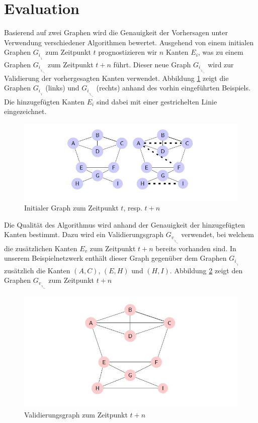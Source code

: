 \section{Evaluation}
Basierend auf zwei Graphen wird die Genauigkeit der Vorhersagen unter Verwendung verschiedener Algorithmen bewertet.
Ausgehend von einem initialen Graphen $G_i_,_t$ zum Zeitpunkt $t$ prognostizieren wir $n$ Kanten $E_i$, was zu einem Graphen $G_i_,_t_+_n$ zum Zeitpunkt $t + n$ führt.
Dieser neue Graph $G_i_,_t_+_n$  wird zur Validierung der vorhergesagten Kanten verwendet.
Abbildung \ref{fig:graph_init} zeigt die Graphen $G_i_,_t$ (links) und $G_i_,_t_+_n$ (rechts) anhand des vorhin eingeführten Beispiels.
Die hinzugefügten Kanten $E_i$ sind dabei mit einer gestrichelten Linie eingezeichnet.

\begin{figure}[h]
    \centering
    \includegraphics{resources/graph_init.JPG}
    \caption{Initialer Graph zum Zeitpunkt $t$, resp. $t + n$}
    \label{fig:graph_init}
\end{figure}

Die Qualität des Algorithmus wird anhand der Genauigkeit der hinzugefügten Kanten bestimmt.
Dazu wird ein Validierungsgraph $G_v_,_t_+_n$ verwendet, bei welchem die zusätzlichen Kanten $E_v$ zum Zeitpunkt $t + n$ bereits vorhanden sind.
In unserem Beispielnetzwerk enthält dieser Graph gegenüber dem Graphen $G_i_,_t$ zusätzlich die Kanten $(A,C)$, $(E,H)$ und $(H,I)$.
Abbildung \ref{fig:graph_validation} zeigt den Graphen $G_v_,_t_+_n$ zum Zeitpunkt $t + n$

\begin{figure}[h]
    \centering
    \includegraphics{resources/graph_validation.JPG}
    \caption{Validierungsgraph zum Zeitpunkt $t + n$}
    \label{fig:graph_validation}
\end{figure}

